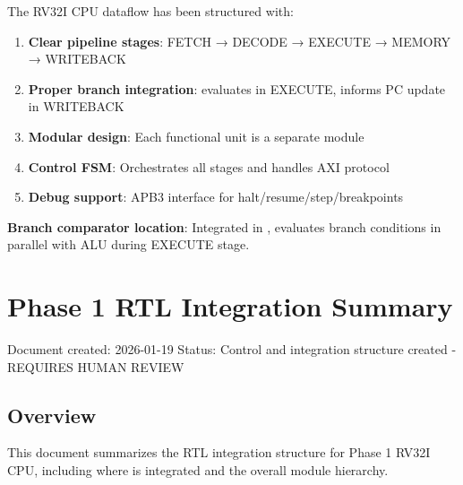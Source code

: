 \begin{record}

The RV32I CPU dataflow has been structured with:

\begin{enumerate}
\def\labelenumi{\arabic{enumi}.}
\tightlist
\item
  \textbf{Clear pipeline stages}: FETCH → DECODE → EXECUTE → MEMORY →
  WRITEBACK
\item
  \textbf{Proper branch integration}: 
  evaluates in EXECUTE, informs PC update in WRITEBACK
\item
  \textbf{Modular design}: Each functional unit is a separate module
\item
  \textbf{Control FSM}: Orchestrates all stages and handles AXI protocol
\item
  \textbf{Debug support}: APB3 interface for
  halt/\allowbreak{}resume/\allowbreak{}step/\allowbreak{}breakpoints
\end{enumerate}

\textbf{Branch comparator location}: Integrated in ,
evaluates branch conditions in parallel with ALU during EXECUTE stage.

\end{record}

\section{Phase 1 RTL Integration Summary}\label{cr:fix:cpu-integration-summary}

\begin{record}

Document created: 2026-01-19 Status: Control and integration structure
created - REQUIRES HUMAN REVIEW

\end{record}

\subsection{Overview}\label{cr:fix:cpu-integration-summary:overview}

\begin{record}

This document summarizes the RTL integration structure for Phase 1 RV32I
CPU, including where  is integrated and the
overall module hierarchy.

\end{record}

